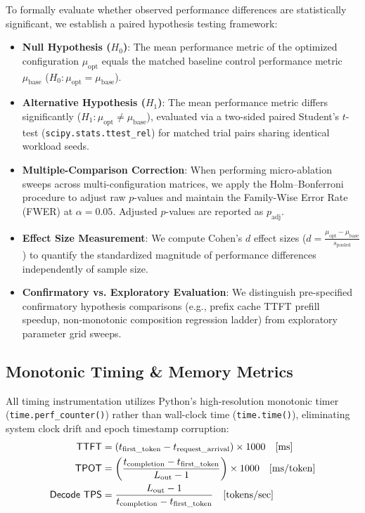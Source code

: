 To formally evaluate whether observed performance differences are statistically significant, we establish a paired hypothesis testing framework:
\begin{itemize}
    \item \textbf{Null Hypothesis ($H_0$)}: The mean performance metric of the optimized configuration $\mu_{\text{opt}}$ equals the matched baseline control performance metric $\mu_{\text{base}}$ ($H_0: \mu_{\text{opt}} = \mu_{\text{base}}$).
    \item \textbf{Alternative Hypothesis ($H_1$)}: The mean performance metric differs significantly ($H_1: \mu_{\text{opt}} \neq \mu_{\text{base}}$), evaluated via a two-sided paired Student's $t$-test (\texttt{scipy.stats.ttest\_rel}) for matched trial pairs sharing identical workload seeds.
    \item \textbf{Multiple-Comparison Correction}: When performing micro-ablation sweeps across multi-configuration matrices, we apply the Holm--Bonferroni procedure to adjust raw $p$-values and maintain the Family-Wise Error Rate (FWER) at $\alpha = 0.05$. Adjusted $p$-values are reported as $p_{\text{adj}}$.
    \item \textbf{Effect Size Measurement}: We compute Cohen's $d$ effect sizes ($d = \frac{\mu_{\text{opt}} - \mu_{\text{base}}}{s_{\text{pooled}}}$) to quantify the standardized magnitude of performance differences independently of sample size.
    \item \textbf{Confirmatory vs. Exploratory Evaluation}: We distinguish pre-specified confirmatory hypothesis comparisons (e.g., prefix cache TTFT prefill speedup, non-monotonic composition regression ladder) from exploratory parameter grid sweeps.
\end{itemize}

\subsection{Monotonic Timing \& Memory Metrics}
\label{sec:meth_metrics}

All timing instrumentation utilizes Python's high-resolution monotonic timer (\texttt{time.perf\_counter()}) rather than wall-clock time (\texttt{time.time()}), eliminating system clock drift and epoch timestamp corruption:
\begin{align}
    \text{\textsf{TTFT}} &= \left(t_{\text{first\_token}} - t_{\text{request\_arrival}}\right) \times 1000 \quad [\text{ms}] \\
    \text{\textsf{TPOT}} &= \left(\frac{t_{\text{completion}} - t_{\text{first\_token}}}{L_{\text{out}} - 1}\right) \times 1000 \quad [\text{ms/token}] \\
    \text{\textsf{Decode TPS}} &= \frac{L_{\text{out}} - 1}{t_{\text{completion}} - t_{\text{first\_token}}} \quad [\text{tokens/sec}]
\end{align}

